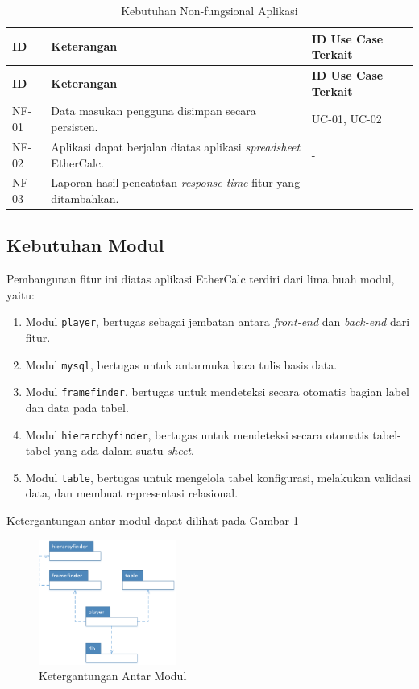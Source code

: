 	\begin{small}
	\begin{longtable}{ | p{2cm} | p{6cm} | p{4cm} | }
	    \caption{Kebutuhan Non-fungsional Aplikasi}
	    \label{KebutuhanNonfungsional}\\ \hline
	    \centering\bfseries{ID} & \centering\bfseries{Keterangan} & \centering\bfseries{ID Use Case Terkait} \tabularnewline \hline
	    \endfirsthead
	    \hline
	    \centering\bfseries{ID} & \centering\bfseries{Keterangan} & \centering\bfseries{ID Use Case Terkait} \tabularnewline \hline
	    \endhead
	    NF-01 & Data masukan pengguna disimpan secara persisten. & UC-01, UC-02 \\ \hline
	    NF-02 & Aplikasi dapat berjalan diatas aplikasi \textit{spreadsheet} EtherCalc. & - \\ \hline
	    NF-03 & Laporan hasil pencatatan \textit{response time} fitur yang ditambahkan. & - \\ \hline
	\end{longtable}
	\end{small}

	\subsection{Kebutuhan Modul} \label{KebutuhanModul}
	Pembangunan fitur ini diatas aplikasi EtherCalc terdiri dari lima buah modul, yaitu:
	\begin{enumerate}
		\item Modul \texttt{player}, bertugas sebagai jembatan antara \textit{front-end} dan \textit{back-end} dari fitur.
		\item Modul \texttt{mysql}, bertugas untuk antarmuka baca tulis basis data.
		\item Modul \texttt{framefinder}, bertugas untuk mendeteksi secara otomatis bagian label dan data pada tabel.
		\item Modul \texttt{hierarchyfinder}, bertugas untuk mendeteksi secara otomatis tabel-tabel yang ada dalam suatu \textit{sheet}.
		\item Modul \texttt{table}, bertugas untuk mengelola tabel konfigurasi, melakukan validasi data, dan membuat representasi relasional.
	\end{enumerate}

	Ketergantungan antar modul dapat dilihat pada Gambar \ref{ModuleDependency}

	\begin{figure}[htb]
	    \centering
	    \includegraphics[width=0.4\textwidth]{resources/chapter-4-module-dependecy.png}
	    \caption{Ketergantungan Antar Modul}
		\label{ModuleDependency}
	\end{figure}

